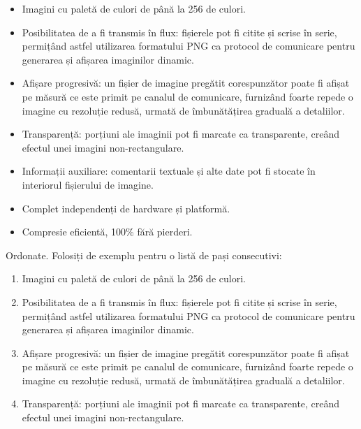 \documentclass[a4paper,12pt]{report}
\begin{document}
\begin{itemize}
    \item
        Imagini cu paletă de culori de până la 256 de culori.
        
    \item
        Posibilitatea de a fi transmis în flux:
        fișierele pot fi citite și scrise în serie, permițând astfel utilizarea formatului
        PNG ca protocol de comunicare pentru generarea și afișarea imaginilor dinamic.

    \item
        Afișare progresivă: un fișier de imagine pregătit corespunzător poate fi
        afișat pe măsură ce este primit pe canalul de comunicare,
        furnizând foarte repede o imagine cu rezoluție redusă,
        urmată de îmbunătățirea graduală a detaliilor.

    \item
        Transparență: porțiuni ale imaginii pot fi marcate ca transparente,
        creând efectul unei imagini non-rectangulare.

    \item 
        Informații auxiliare: comentarii textuale și alte date pot fi
        stocate în interiorul fișierului de imagine.

    \item
        Complet independenți de hardware și platformă.

    \item
        Compresie eficientă, 100\% fără pierderi.
\end{itemize}

Ordonate. Folosiți de exemplu pentru o listă de pași consecutivi:

\begin{enumerate}
    \item 
        Imagini cu paletă de culori de până la 256 de culori.
    \item 
        Posibilitatea de a fi transmis în flux:
        fișierele pot fi citite și scrise în serie, permițând astfel utilizarea formatului
        PNG ca protocol de comunicare pentru generarea și afișarea imaginilor dinamic.
    \item 
        Afișare progresivă: un fișier de imagine pregătit corespunzător poate fi
        afișat pe măsură ce este primit pe canalul de comunicare,
        furnizând foarte repede o imagine cu rezoluție redusă,
        urmată de îmbunătățirea graduală a detaliilor.
    \item 
        Transparență: porțiuni ale imaginii pot fi marcate ca transparente,
        creând efectul unei imagini non-rectangulare.
\end{enumerate}
\end{document}
